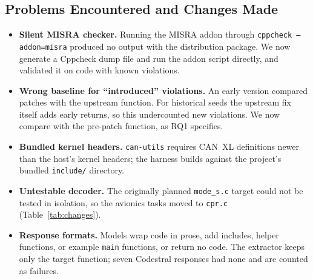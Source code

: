 \documentclass[12pt]{IEEEtran}
\begin{document}
\subsection{Problems Encountered and Changes Made}
\begin{itemize}
    \item \textbf{Silent MISRA checker.} Running the MISRA addon through \texttt{cppcheck --addon=misra} produced no output with the distribution package. We now generate a Cppcheck dump file and run the addon script directly, and validated it on code with known violations.
    \item \textbf{Wrong baseline for ``introduced'' violations.} An early version compared patches with the upstream function. For historical seeds the upstream fix itself adds early returns, so this undercounted new violations. We now compare with the pre-patch function, as RQ1 specifies.
    \item \textbf{Bundled kernel headers.} \texttt{can-utils} requires CAN~XL definitions newer than the host's kernel headers; the harness builds against the project's bundled \texttt{include/} directory.
    \item \textbf{Untestable decoder.} The originally planned \texttt{mode\_s.c} target could not be tested in isolation, so the avionics tasks moved to \texttt{cpr.c} (Table~\ref{tab:changes}).
    \item \textbf{Response formats.} Models wrap code in prose, add includes, helper functions, or example \texttt{main} functions, or return no code. The extractor keeps only the target function; seven Codestral responses had none and are counted as failures.
\end{itemize}

\end{document}
